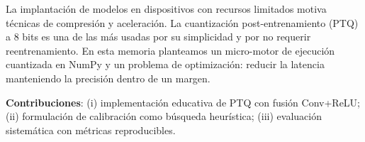 La implantación de modelos en dispositivos con recursos limitados motiva técnicas
de compresión y aceleración. La cuantización post-entrenamiento (PTQ) a 8 bits es
una de las más usadas por su simplicidad y por no requerir reentrenamiento.
En esta memoria planteamos un micro-motor de ejecución cuantizada en NumPy y
un problema de optimización: reducir la latencia manteniendo la precisión dentro de un margen.

\textbf{Contribuciones}:
(i) implementación educativa de PTQ con fusión Conv+ReLU;
(ii) formulación de calibración como búsqueda heurística;
(iii) evaluación sistemática con métricas reproducibles.
